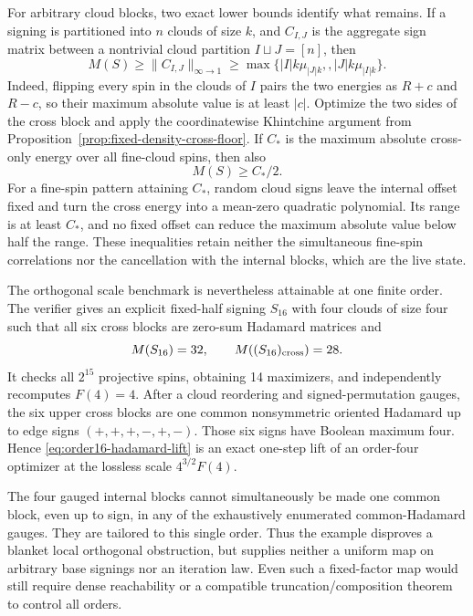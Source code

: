 \documentclass[11pt]{article}
\begin{document}
For arbitrary cloud blocks, two exact lower bounds identify what remains.
If a signing is partitioned into $n$ clouds of size $k$, and
$C_{I,J}$ is the aggregate sign matrix between a nontrivial cloud partition
$I\sqcup J=[n]$, then
\begin{equation}
 M(S)\ge\|C_{I,J}\|_{\infty\to1}
 \ge\max\{|I|k\mu_{|J|k},,|J|k\mu_{|I|k}\}.          \label{eq:cloud-bipartition-floor}
\end{equation}
Indeed, flipping every spin in the clouds of $I$ pairs the two energies as
$R+c$ and $R-c$, so their maximum absolute value is at least $|c|$.
Optimize the two sides of the cross block and apply the coordinatewise
Khintchine argument from Proposition~\ref{prop:fixed-density-cross-floor}.
If $C_*$ is the maximum absolute cross-only energy over all fine-cloud spins,
then also
\begin{equation}
 M(S)\ge C_*/2.                                       \label{eq:cloud-cross-half}
\end{equation}
For a fine-spin pattern attaining $C_*$, random cloud signs leave the internal
offset fixed and turn the cross energy into a mean-zero quadratic polynomial.
Its range is at least $C_*$, and no fixed offset can reduce the maximum
absolute value below half the range.  These inequalities retain neither the
simultaneous fine-spin correlations nor the cancellation with the internal
blocks, which are the live state.

The orthogonal scale benchmark is nevertheless attainable at one finite
order.  The verifier gives an explicit fixed-half signing $S_{16}$ with four
clouds of size four such that all six cross blocks are zero-sum Hadamard
matrices and
\begin{equation}
 M(S_{16})=32,\qquad M((S_{16})_{\rm cross})=28.     \label{eq:order16-hadamard-lift}
\end{equation}
It checks all $2^{15}$ projective spins, obtaining 14 maximizers, and
independently recomputes $F(4)=4$.  After a cloud reordering and
signed-permutation gauges, the six upper cross blocks are one common
nonsymmetric oriented Hadamard up to edge signs
$(+,+,+,-,+,-)$.  Those six signs have Boolean maximum four.  Hence
\eqref{eq:order16-hadamard-lift} is an exact one-step lift of an order-four
optimizer at the lossless scale $4^{3/2}F(4)$.

The four gauged internal blocks cannot simultaneously be made one common
block, even up to sign, in any of the exhaustively enumerated common-Hadamard
gauges.  They are tailored to this single order.  Thus the example disproves
a blanket local orthogonal obstruction, but supplies neither a uniform map on
arbitrary base signings nor an iteration law.  Even such a fixed-factor map
would still require dense reachability or a compatible truncation/composition
theorem to control all orders.
\end{document}
